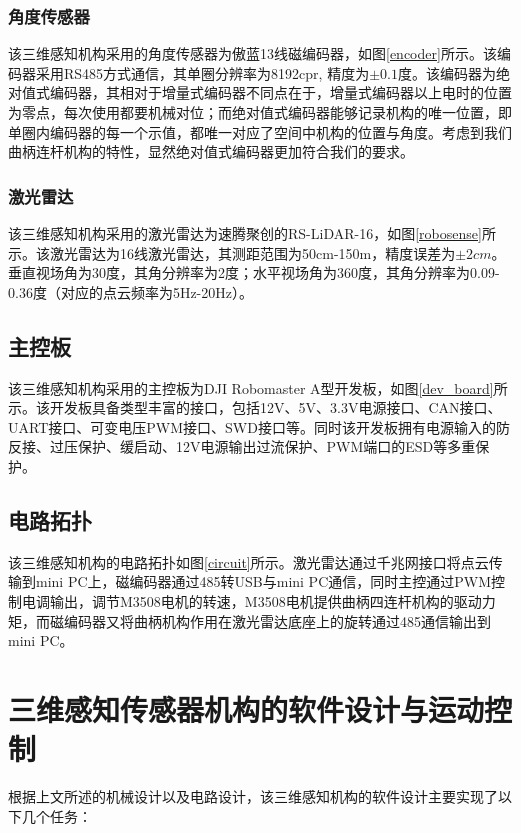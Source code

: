 \subsubsection{角度传感器}
该三维感知机构采用的角度传感器为傲蓝13线磁编码器，如图\ref{encoder}所示。该编码器采用RS485方式通信，其单圈分辨率为8192cpr, 精度为$\pm 0.1$度。该编码器为绝对值式编码器，其相对于增量式编码器不同点在于，增量式编码器以上电时的位置为零点，每次使用都要机械对位；而绝对值式编码器能够记录机构的唯一位置，即单圈内编码器的每一个示值，都唯一对应了空间中机构的位置与角度。考虑到我们曲柄连杆机构的特性，显然绝对值式编码器更加符合我们的要求。

\subsubsection{激光雷达}
该三维感知机构采用的激光雷达为速腾聚创的RS-LiDAR-16，如图\ref{robosense}所示。该激光雷达为16线激光雷达，其测距范围为50cm-150m，精度误差为$\pm 2cm$。垂直视场角为30度，其角分辨率为2度；水平视场角为360度，其角分辨率为0.09-0.36度（对应的点云频率为5Hz-20Hz）。

\subsection{主控板}
该三维感知机构采用的主控板为DJI Robomaster A型开发板，如图\ref{dev_board}所示。该开发板具备类型丰富的接口，包括12V、5V、3.3V电源接口、CAN接口、UART接口、可变电压PWM接口、SWD接口等。同时该开发板拥有电源输入的防反接、过压保护、缓启动、12V电源输出过流保护、PWM端口的ESD等多重保护。

\subsection{电路拓扑}
该三维感知机构的电路拓扑如图\ref{circuit}所示。激光雷达通过千兆网接口将点云传输到mini PC上，磁编码器通过485转USB与mini PC通信，同时主控通过PWM控制电调输出，调节M3508电机的转速，M3508电机提供曲柄四连杆机构的驱动力矩，而磁编码器又将曲柄机构作用在激光雷达底座上的旋转通过485通信输出到mini PC。

\section{三维感知传感器机构的软件设计与运动控制}

根据上文所述的机械设计以及电路设计，该三维感知机构的软件设计主要实现了以下几个任务：

